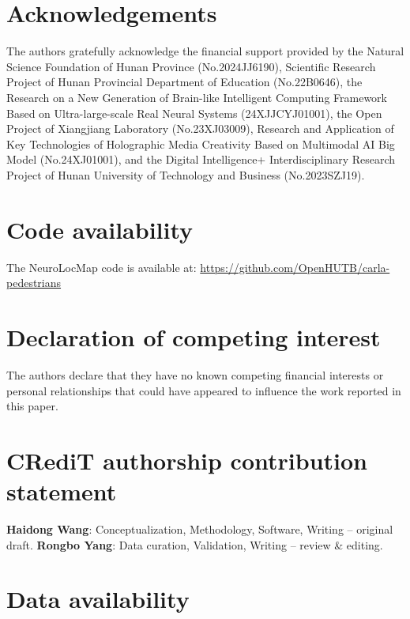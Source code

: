 \documentclass[review,12pt]{elsarticle}
\begin{document}
\section*{Acknowledgements}

The authors gratefully acknowledge the financial support provided by the Natural Science Foundation of Hunan Province (No.2024JJ6190), Scientific Research Project of Hunan Provincial Department of Education (No.22B0646), the Research on a New Generation of Brain-like Intelligent Computing Framework Based on Ultra-large-scale Real Neural Systems (24XJJCYJ01001), the Open Project of Xiangjiang Laboratory (No.23XJ03009), Research and Application of Key Technologies of Holographic Media Creativity Based on Multimodal AI Big Model (No.24XJ01001), and the Digital Intelligence+ Interdisciplinary Research Project of Hunan University of Technology and Business (No.2023SZJ19).

\section*{Code availability}

The NeuroLocMap code is available at: \url{https://github.com/OpenHUTB/carla-pedestrians}

\section*{Declaration of competing interest}

The authors declare that they have no known competing financial interests or personal relationships that could have appeared to influence the work reported in this paper.

\section*{CRediT authorship contribution statement}

\textbf{Haidong Wang}: Conceptualization, Methodology, Software, Writing -- original draft. \textbf{Rongbo Yang}: Data curation, Validation, Writing -- review \& editing.

\section*{Data availability}
\end{document}
